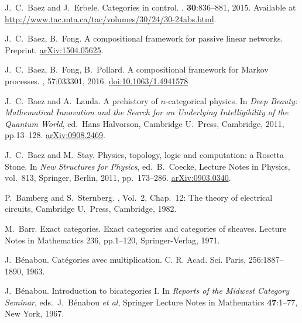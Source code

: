 \begin{thebibliography}{RSW00}
    J.\ C.\ Baez and J.\ Erbele.
    \newblock Categories in control. 
    , {\bf 30}:836--881,
    2015. 
    \newblock Available at
    \href{http://www.tac.mta.ca/tac/volumes/30/24/30-24abs.html}{http://www.tac.mta.ca/tac/volumes/30/24/30-24abs.html}.

    J.\ C.\ Baez, B.\ Fong. 
    \newblock A compositional framework for passive linear networks.
    \newblock Preprint. 
    \newblock \href{http://arxiv.org/abs/1504.05625}{arXiv:1504.05625}. 

    J.\ C.\ Baez, B.\ Fong, B.\ Pollard. 
    \newblock A compositional framework for Markov processes.
    , 57:033301, 2016.  
    \newblock \href{http://dx.doi.org/10.1063/1.4941578}{doi:10.1063/1.4941578}

    J.\ C.\ Baez and A.\ Lauda.
    \newblock A prehistory of $n$-categorical
    physics. 
    \newblock In {\em Deep Beauty: Mathematical Innovation and
    the Search for an Underlying Intelligibility of the Quantum World}, ed.\
    Hans Halvorson, Cambridge U.\ Press, Cambridge, 2011, pp.13--128.  
    \newblock \href{http://arxiv.org/abs/0908.2469}{arXiv:0908.2469}.

    J.\ C.\ Baez and M.\ Stay. 
    \newblock Physics, topology, logic and 
    computation: a Rosetta Stone. 
    \newblock In {\sl New Structures for Physics}, ed.\ B.\ Coecke,  
    Lecture Notes in Physics, vol.\ 813, Springer, Berlin, 2011, pp.\ 173--286.
    \newblock \href{http://arxiv.org/abs/0903.0340}{arXiv:0903.0340}.

    P.\ Bamberg and S.\ Sternberg. 
    , Vol.\ 2, Chap.\ 12: The theory of electrical circuits,
    Cambridge U.\ Press, Cambridge, 1982. 

    M.\ Barr.
    \newblock Exact categories.
    \newblock Exact categories and categories of sheaves. Lecture Notes in
    Mathematics 236, pp.1--120, Springer-Verlag, 1971.

    J.\ B\'enabou.
    \newblock Cat\'egories avec multiplication. 
    \newblock C. R. Acad. Sci. Paris, 256:1887–1890, 1963.

    J.\ B\'enabou.
    \newblock Introduction to bicategories I.
    \newblock In \textsl{Reports
    of the Midwest Category Seminar}, eds.\ J.\ B\'enabou \textit{et al},
    Springer Lecture Notes in Mathematics {\bf 47}:1--77, New York, 1967.


\end{thebibliography}
